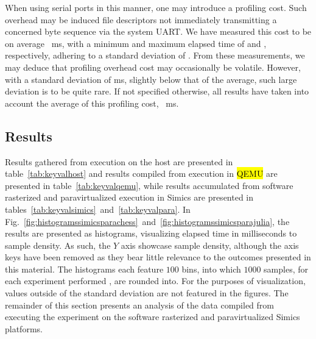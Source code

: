 When using serial ports in this manner, one may introduce a profiling cost.
Such overhead may be induced file descriptors not immediately transmitting a concerned byte sequence via the system UART.
We have measured this cost to be on average ~ms, with a minimum and maximum elapsed time of  and , respectively, adhering to a standard deviation of .
From these measurements, we may deduce that profiling overhead cost may occasionally be volatile.
However, with a standard deviation of  ms, slightly below that of the average, such large deviation is to be quite rare.
If not specified otherwise, all results have taken into account the average of this profiling cost, ~ms.

\subsection{Results}
\label{sec:results}
Results gathered from execution on the host are presented in table~\ref{tab:keyvalhost} and results compiled from execution in \hl{QEMU} are presented in table~\ref{tab:keyvalqemu}, while results accumulated from software rasterized and paravirtualized execution in Simics are presented in tables~\ref{tab:keyvalsimics}~and~\ref{tab:keyvalpara}.
In Fig.~\ref{fig:histogramssimicsparachess}~and~\ref{fig:histogramssimicsparajulia}, the results are presented as histograms, visualizing elapsed time in milliseconds to sample density.
As such, the $Y$ axis showcase sample density, although the axis keys have been removed as they bear little relevance to the outcomes presented in this material.
The histograms each feature $100$ bins, into which $1000$ samples, for each experiment performed , are rounded into.
For the purposes of visualization, values outside of the standard deviation are not featured in the figures.
The remainder of this section presents an analysis of the data compiled from executing the experiment on the software rasterized and paravirtualized Simics platforms.

\providecommand{\chesskeyone}{$60\times60$ tiles}
\providecommand{\chesskeytwo}{$84\times84$ tiles}
\providecommand{\chesskeythree}{$118\times118$ tiles}

\providecommand{\juliakeyone}{$225$ iterations}
\providecommand{\juliakeytwo}{$450$ iterations}
\providecommand{\juliakeythree}{$900$ iterations}

